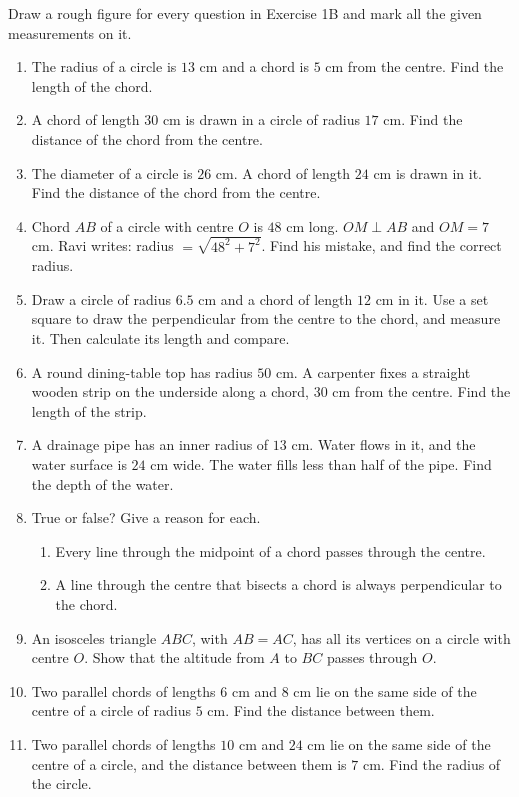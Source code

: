 \documentclass[11pt,a4paper]{article}
\theoremstyle{branddef}
\newenvironment{exercise}[1]
  {\par\medskip\Needspace{7\baselineskip}\noindent{\large\bfseries Exercise #1}
   \par\smallskip
   \begin{enumerate}[leftmargin=*,itemsep=4pt]}
  {\end{enumerate}}
\begin{document}
Draw a rough figure for every question in Exercise 1B and mark all the given measurements on it.
\begin{exercise}{1B}
\item The radius of a circle is $13$ cm and a chord is $5$ cm from the centre. Find the length of the chord.
\item A chord of length $30$ cm is drawn in a circle of radius $17$ cm. Find the distance of the chord from the centre.
\item The diameter of a circle is $26$ cm. A chord of length $24$ cm is drawn in it. Find the distance of the chord from the centre.
\item Chord $AB$ of a circle with centre $O$ is $48$ cm long. $OM\perp AB$ and $OM=7$ cm. Ravi writes: radius $=\sqrt{48^2+7^2}$. Find his mistake, and find the correct radius.
\item Draw a circle of radius $6.5$ cm and a chord of length $12$ cm in it. Use a set square to draw the perpendicular from the centre to the chord, and measure it. Then calculate its length and compare.
\item A round dining-table top has radius $50$ cm. A carpenter fixes a straight wooden strip on the underside along a chord, $30$ cm from the centre. Find the length of the strip.
\item A drainage pipe has an inner radius of $13$ cm. Water flows in it, and the water surface is $24$ cm wide. The water fills less than half of the pipe. Find the depth of the water.
\item True or false? Give a reason for each.
  \begin{enumerate}[label=(\alph*),itemsep=1pt]
    \item Every line through the midpoint of a chord passes through the centre.
    \item A line through the centre that bisects a chord is always perpendicular to the chord.
  \end{enumerate}
\item An isosceles triangle $ABC$, with $AB=AC$, has all its vertices on a circle with centre $O$. Show that the altitude from $A$ to $BC$ passes through $O$.
\item Two parallel chords of lengths $6$ cm and $8$ cm lie on the same side of the centre of a circle of radius $5$ cm. Find the distance between them.
\item Two parallel chords of lengths $10$ cm and $24$ cm lie on the same side of the centre of a circle, and the distance between them is $7$ cm. Find the radius of the circle.
\end{exercise}
\end{document}
